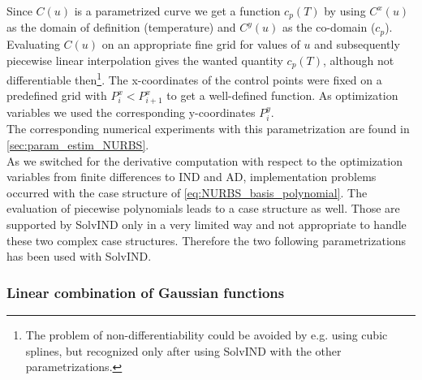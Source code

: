 \documentclass{scrartcl}[12pt, halfparskip]
\numberwithin{equation}{section}
\numberwithin{figure}{section}
\numberwithin{table}{section}
\begin{document}
Since $C(u)$ is a parametrized curve we get a function $c_p(T)$ by using $C^x(u)$ as the domain of definition (temperature) and $C^y(u)$ as the co-domain ($c_p$). Evaluating $C(u)$ on an appropriate fine grid for values of $u$ and subsequently piecewise linear interpolation gives the wanted quantity $c_p(T)$, although not differentiable then\footnote{The problem of non-differentiability could be avoided by e.g. using cubic splines, but recognized only after using SolvIND with the other parametrizations.}.
The x-coordinates of the control points were fixed on a predefined grid with $P_i^x < P_{i+1}^x$ to get a well-defined function.
As optimization variables we used the corresponding y-coordinates $P_i^y$. \\
The corresponding numerical experiments with this parametrization are found in \cref{sec:param_estim_NURBS}. \\

As we switched for the derivative computation with respect to the optimization variables from finite differences to IND and AD, implementation problems occurred with the case structure of \cref{eq:NURBS_basis_polynomial}. The evaluation of piecewise polynomials leads to a case structure as well. Those are supported by SolvIND only in a very limited way and not appropriate to handle these two complex case structures. 
Therefore the two following parametrizations has been used with SolvIND.


\subsubsection{Linear combination of Gaussian functions}
\label{sec:parametrization_Gausse}

\end{document}

